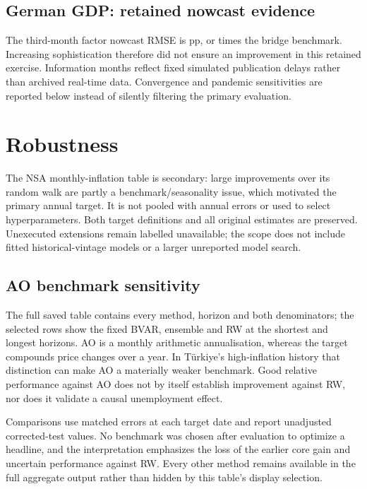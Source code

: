 \subsection{German GDP: retained nowcast evidence}

The third-month factor nowcast RMSE is \NowcastRMSE{} pp, or \NowcastRatio{} times the bridge benchmark. Increasing sophistication therefore did not ensure an improvement in this retained exercise. Information months reflect fixed simulated publication delays rather than archived real-time data. Convergence and pandemic sensitivities are reported below instead of silently filtering the primary evaluation.
\section{Robustness}




The NSA monthly-inflation table is secondary: large improvements over its random walk are partly a benchmark/seasonality issue, which motivated the primary annual target. It is not pooled with annual errors or used to select hyperparameters. Both target definitions and all original estimates are preserved. Unexecuted extensions remain labelled unavailable; the scope does not include fitted historical-vintage models or a larger unreported model search.
\subsection{AO benchmark sensitivity}

The full saved table contains every method, horizon and both denominators; the selected rows show the fixed BVAR, ensemble and RW at the shortest and longest horizons. AO is a monthly arithmetic annualisation, whereas the target compounds price changes over a year. In Türkiye's high-inflation history that distinction can make AO a materially weaker benchmark. Good relative performance against AO does not by itself establish improvement against RW, nor does it validate a causal unemployment effect.

Comparisons use matched errors at each target date and report unadjusted corrected-test values. No benchmark was chosen after evaluation to optimize a headline, and the interpretation emphasizes the loss of the earlier core gain and uncertain performance against RW. Every other method remains available in the full aggregate output rather than hidden by this table's display selection.
